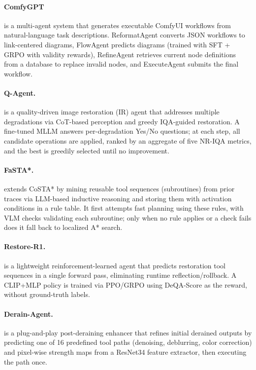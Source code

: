 \paragraph{ComfyGPT}
 is a multi-agent system that generates executable ComfyUI workflows from natural-language task descriptions. ReformatAgent converts JSON workflows to link-centered diagrams, FlowAgent predicts diagrams (trained with SFT + GRPO with validity rewards), RefineAgent retrieves current node definitions from a database to replace invalid nodes, and ExecuteAgent submits the final workflow. ~\cite{huang2025comfygpt}

\paragraph{Q-Agent.}
 is a quality-driven image restoration (IR) agent that addresses multiple degradations via CoT-based perception and greedy IQA-guided restoration. A fine-tuned MLLM answers per-degradation Yes/No questions; at each step, all candidate operations are applied, ranked by an aggregate of five NR-IQA metrics, and the best is greedily selected until no improvement. ~\cite{avg250407148}

\paragraph{FaSTA*.}
 extends CoSTA* by mining reusable tool sequences (subroutines) from prior traces via LLM-based inductive reasoning and storing them with activation conditions in a rule table. It first attempts fast planning using these rules, with VLM checks validating each subroutine; only when no rule applies or a check fails does it fall back to localized A* search. ~\cite{gupta2025fasta}

\paragraph{Restore-R1.}
 is a lightweight reinforcement-learned agent that predicts restoration tool sequences in a single forward pass, eliminating runtime reflection/rollback. A CLIP+MLP policy is trained via PPO/GRPO using DeQA-Score as the reward, without ground-truth labels. ~\cite{avg251218599}

\paragraph{Derain-Agent.}
 is a plug-and-play post-deraining enhancer that refines initial derained outputs by predicting one of 16 predefined tool paths (denoising, deblurring, color correction) and pixel-wise strength maps from a ResNet34 feature extractor, then executing the path once. ~\cite{avg260311866}

